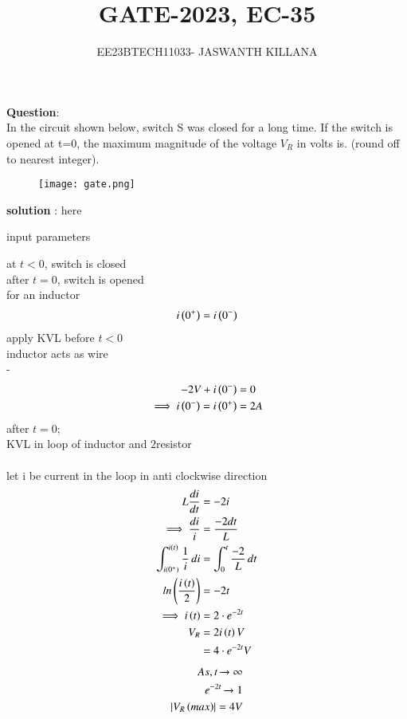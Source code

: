 \documentclass[journal,12pt,twocolumn]{IEEEtran}
\theoremstyle{remark}
\begin{document}

\vspace{3cm}

\title{GATE-2023, EC-35}
\author{EE23BTECH11033- JASWANTH KILLANA}
\maketitle
\newpage
\bigskip

\renewcommand{\thefigure}{\theenumi}
\renewcommand{\thetable}{\theenumi}
\textbf{Question}:\\
In the circuit shown below, switch S was closed for a long time. If the switch is opened at t=0, the maximum magnitude of the voltage $V_R$ in volts is. (round off to nearest integer).\\
\begin{figure}[th]
\centering
\texttt{[image: gate.png]}
\caption{}
\label{}
\end{figure}
\textbf{solution} :
here\begin{table}[!ht]
 \centering
  
   \caption{input parameters}
   \label{GATE-2023,EC-35}
   \end{table}
at $t<0$, switch is closed\\
after $t=0$, switch is opened\\
for an inductor \begin{align}
i\left(0^{+}\right)=i\left(0^{-}\right)
\end{align}
apply KVL before $t<0$\\
inductor acts as wire\\
-\begin{align}
-2V+i\left(0^-\right)&=0\\
\implies i\left(0^-\right)=i\left(0^+\right)&=2A
\end{align}
after $t=0$;\\
KVL in loop of inductor and  $2$\ohm \quad resistor\\
\\ let i be current in the loop in anti clockwise direction\\
\begin{align}
L\frac{di}{dt}&=-2i\\
\implies\frac{di}{i}&=\frac{-2dt}{L}\\
\int_{i\left(0^+\right)}^{i\left(t\right)}{\frac{1}{i}\,di}&=\int_{0}^{t}{\frac{-2}{L}\,dt}\\
ln\left(\frac{i\left(t\right)}{2}\right)&=-2t\\
\implies i\left(t\right)&=2\cdot{e^{-2t}}\\
V_{R}&=2i\left(t\right)V\\
 &=4\cdot{e^{-2t}}V
 \end{align}
 \begin{align}
 As, t\xrightarrow{}\infty\\
 e^{-2t}\xrightarrow{}1\\
 \left\vert V_R\left(max\right)\right\vert=4V
\end{align}
\end{document}
